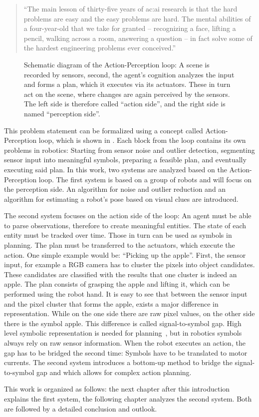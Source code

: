 \begin{quote}
  ``The main lesson of thirty-five years of \gls{ac:ai} research is that the hard problems are easy and the easy problems are hard. The mental abilities of a four-year-old that we take for granted – recognizing a face, lifting a pencil, walking across a room, answering a question – in fact solve some of the hardest engineering problems ever conceived.''
\end{quote}

\begin{figure}
  \centering
  
  \caption{Schematic diagram of the Action-Perception loop: A scene is re\-cor\-ded by sensors, second, the agent's cognition analyzes the input and forms a plan, which it executes via its actuators. These in turn act on the scene, where changes are again perceived by the sensors. The left side is therefore called ``action side'', and the right side is named ``perception side''.}
  \label{fig:introduction_actionperceptionloop}
\end{figure}

This problem statement can be formalized using a concept called Action-Per\-cep\-tion loop, which is shown in .
Each block from the loop contains its own problems in robotics: Starting from sensor noise and outlier detection, segmenting sensor input into meaningful symbols, preparing a feasible plan, and eventually executing said plan.
In this work, two systems are analyzed based on the Action-Perception loop.
The first system is based on a group of robots and will focus on the perception side.
An algorithm for noise and outlier reduction and an algorithm for estimating a robot's pose based on visual clues are introduced.

The second system focuses on the action side of the loop: An agent must be able to parse observations, therefore to create meaningful entities.
The state of each entity must be tracked over time.
Those in turn can be used as symbols in planning.
The plan must be transferred to the actuators, which execute the action.
One simple example would be: ``Picking up the apple''.
First, the sensor input, for example a RGB camera has to cluster the pixels into object candidates.
These candidates are classified with the results that one cluster is indeed an apple.
The plan consists of grasping the apple and lifting it, which can be performed using the robot hand.
It is easy to see that between the sensor input and the pixel cluster that forms the apple, exists a major difference in representation.
While on the one side there are raw pixel values, on the other side there is the symbol apple.
This difference is called signal-to-symbol gap.
High level symbolic representation is needed for planning~\cite{mcdermott1998}, but in robotics symbols always rely on raw sensor information.
When the robot executes an action, the gap has to be bridged the second time: Symbols have to be translated to motor currents.
The second system introduces a bottom-up method to bridge the signal-to-symbol gap and which allows for complex action planning.

This work is organized as follows: the next chapter after this introduction explains the first system, the following chapter analyzes the second system.
Both are followed by a detailed conclusion and outlook.
